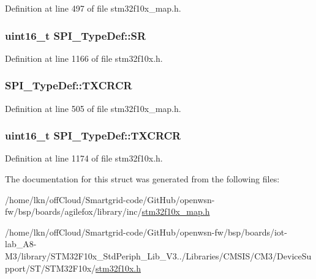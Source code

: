 Definition at line 497 of file stm32f10x\+\_\+map.\+h.

\subsubsection[{\texorpdfstring{SR}{SR}}]{ {\bf uint16\+\_\+t} S\+P\+I\+\_\+\+Type\+Def\+::\+SR}\hypertarget{struct_s_p_i___type_def_a017d7d54a7bf1925facea6b5e02fec83}{}\label{struct_s_p_i___type_def_a017d7d54a7bf1925facea6b5e02fec83}


Definition at line 1166 of file stm32f10x.\+h.

\subsubsection[{\texorpdfstring{T\+X\+C\+R\+CR}{TXCRCR}}]{ S\+P\+I\+\_\+\+Type\+Def\+::\+T\+X\+C\+R\+CR}\hypertarget{struct_s_p_i___type_def_a769da25f4ef8f003f0b1edf140f83e99}{}\label{struct_s_p_i___type_def_a769da25f4ef8f003f0b1edf140f83e99}


Definition at line 505 of file stm32f10x\+\_\+map.\+h.

\subsubsection[{\texorpdfstring{T\+X\+C\+R\+CR}{TXCRCR}}]{ {\bf uint16\+\_\+t} S\+P\+I\+\_\+\+Type\+Def\+::\+T\+X\+C\+R\+CR}\hypertarget{struct_s_p_i___type_def_a3c0c1be66bc0a1846274a7511f4a36f5}{}\label{struct_s_p_i___type_def_a3c0c1be66bc0a1846274a7511f4a36f5}


Definition at line 1174 of file stm32f10x.\+h.



The documentation for this struct was generated from the following files\+:\begin{DoxyCompactItemize}
\item 
/home/lkn/off\+Cloud/\+Smartgrid-\/code/\+Git\+Hub/openwsn-\/fw/bsp/boards/agilefox/library/inc/\hyperlink{agilefox_2library_2inc_2stm32f10x__map_8h}{stm32f10x\+\_\+map.\+h}\item 
/home/lkn/off\+Cloud/\+Smartgrid-\/code/\+Git\+Hub/openwsn-\/fw/bsp/boards/iot-\/lab\+\_\+\+A8-\/\+M3/library/\+S\+T\+M32\+F10x\+\_\+\+Std\+Periph\+\_\+\+Lib\+\_\+\+V3../\+Libraries/\+C\+M\+S\+I\+S/\+C\+M3/\+Device\+Support/\+S\+T/\+S\+T\+M32\+F10x/\hyperlink{iot-lab___a8-_m3_2library_2_s_t_m32_f10x___std_periph___lib___v3_85_80_2_libraries_2_c_m_s_i_s_26497265545392eb5694b064ae15018db}{stm32f10x.\+h}\end{DoxyCompactItemize}
